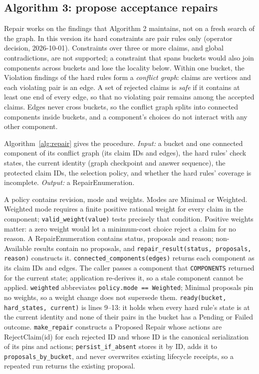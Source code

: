 \documentclass[11pt]{article}
\newcommand{\code}[1]{\texttt{#1}}
\begin{document}
\subsection{Algorithm 3: propose acceptance repairs}

Repair works on the findings that Algorithm 2 maintains, not on a fresh search
of the graph. In this version its hard constraints are pair rules only
(operator decision, 2026-10-01). Constraints over three or more claims, and
global contradictions, are not supported; a constraint that spans buckets would
also join components across buckets and lose the locality below. Within one bucket, the
Violation findings of the hard rules form a \emph{conflict graph}: claims are
vertices and each violating pair is an edge. A set of rejected claims is
\emph{safe} if it contains at least one end of every edge, so that no violating
pair remains among the accepted claims. Edges never cross buckets, so the
conflict graph splits into connected components inside buckets, and a
component's choices do not interact with any other component.

Algorithm~\ref{alg:repair} gives the procedure. \textit{Input:} a bucket and
one connected component of its conflict graph (its claim IDs and edges), the
hard rules' check states, the current identity (graph checkpoint and answer
sequence), the protected claim IDs, the selection policy, and whether the hard
rules' coverage is incomplete. \textit{Output:} a RepairEnumeration.

A policy contains revision, mode and weights. Modes are Minimal or Weighted.
Weighted mode requires a finite positive rational weight for every claim in the
component; \code{valid\_weight(value)} tests precisely that condition. Positive
weights matter: a zero weight would let a minimum-cost choice reject a claim for
no reason. A RepairEnumeration contains status, proposals and reason;
non-Available results contain no proposals, and
\code{repair\_result(status, proposals, reason)} constructs it.
\code{connected\_components(edges)} returns each component as its claim IDs and
edges. The caller passes a component that \code{COMPONENTS} returned for the
current state; application re-derives it, so a stale component cannot be
applied. \code{weighted} abbreviates \code{policy.mode == Weighted}; Minimal
proposals pin no weights, so a weight change does not supersede them. \code{ready(bucket, hard\_states, current)} is lines 9--13: it holds
when every hard rule's state is at the current identity and none of their
pairs in the bucket has a Pending or Failed outcome. \code{make\_repair}
constructs a Proposed Repair whose actions are RejectClaim(id) for each
rejected ID and whose ID is the canonical serialization of its pins and
actions; \code{persist\_if\_absent} stores it by ID, adds it to
\code{proposals\_by\_bucket}, and never overwrites existing lifecycle
receipts, so a repeated run returns the existing proposal.
\end{document}
